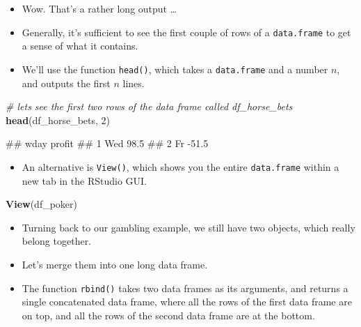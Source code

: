 \documentclass[
]{book}
\newenvironment{Shaded}{\begin{snugshade}}{\end{snugshade}}
\newcommand{\CommentTok}[1]{\textcolor[rgb]{0.56,0.35,0.01}{\textit{#1}}}
\newcommand{\DecValTok}[1]{\textcolor[rgb]{0.00,0.00,0.81}{#1}}
\newcommand{\FunctionTok}[1]{\textcolor[rgb]{0.13,0.29,0.53}{\textbf{#1}}}
\newcommand{\NormalTok}[1]{#1}
\providecommand{\tightlist}{%
  \setlength{\itemsep}{0pt}\setlength{\parskip}{0pt}}
\begin{document}
\begin{itemize}
\item
  Wow. That's a rather long output \ldots{}
\item
  Generally, it's sufficient to see the first couple of rows of a \texttt{data.frame} to get a sense of what it contains.
\item
  We'll use the function \texttt{head()}, which takes a \texttt{data.frame} and a number \(n\), and outputs the first \(n\) lines.
\end{itemize}

\begin{Shaded}
\begin{Highlighting}[]
\CommentTok{\# let\textquotesingle{}s see the first two rows of the data frame called df\_horse\_bets}
\FunctionTok{head}\NormalTok{(df\_horse\_bets, }\DecValTok{2}\NormalTok{) }
\end{Highlighting}
\end{Shaded}

\begin{Shaded}
\begin{Highlighting}[]
\NormalTok{\#\#   wday profit}
\NormalTok{\#\# 1  Wed   98.5}
\NormalTok{\#\# 2   Fr  {-}51.5}
\end{Highlighting}
\end{Shaded}

\begin{itemize}
\tightlist
\item
  An alternative is \texttt{View()}, which shows you the entire \texttt{data.frame} within a new tab in the RStudio GUI.
\end{itemize}

\begin{Shaded}
\begin{Highlighting}[]
\FunctionTok{View}\NormalTok{(df\_poker)}
\end{Highlighting}
\end{Shaded}

\begin{itemize}
\item
  Turning back to our gambling example, we still have two objects, which really belong together.
\item
  Let's merge them into one long data frame.
\item
  The function \texttt{rbind()} takes two data frames as its arguments, and returns a single concatenated data frame, where all the rows of the first data frame are on top, and all the rows of the second data frame are at the bottom.
\end{itemize}
\end{document}
